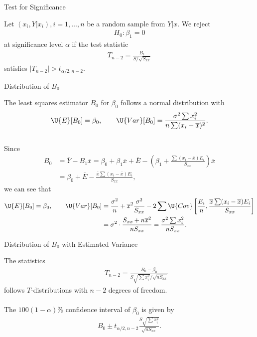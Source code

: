 \begin{frame}{Test for Significance}

\justifying
{} Let $(x_i, Y|x_i), i = 1, \ldots, n$ be a random sample from $Y|x$. We reject
\begin{align*}
H_0: \beta_1 = 0
\end{align*}
at significance level $\alpha$ if the test statistic
\begin{align*}
T_{n-2} = \frac{B_1}{S/\sqrt{S_{xx}}}
\end{align*}
satisfies $|T_{n-2}| > t_{\alpha/2,n-2}$.

\end{frame}

\begin{frame}{Distribution of $B_0$}

 The least squares estimator $B_0$ for $\beta_0$ follows a normal distribution with
\footnotesize
\begin{align*}
\U{E}[B_0] = \beta_0, \qquad \U{Var}[B_0] = \frac{\sigma^2\sum x_i^2}{n\sum (x_i-\overline{x})^2}.
\end{align*}\\
\normalsize
{} Since
\footnotesize
\begin{align*}
B_0 & = \overline{Y} - B_1\overline{x} = \beta_0 + \beta_1\overline{x} + \overline{E} - \left(\beta_1 + \frac{\sum (x_i-\overline{x})E_i}{S_{xx}} \right) \overline{x} \\
& = \beta_0 + \overline{E} - \frac{\overline{x}\sum (x_i-\overline{x})E_i}{S_{xx}},
\end{align*}
\normalsize
we can see that
\footnotesize
\begin{align*}
\U{E}[B_0] = \beta_0, \qquad \U{Var}[B_0] & = \frac{\sigma^2}{n} + \overline{x}^2 \frac{\sigma^2}{S_{xx}} - 2\sum \U{Cov}\left[\frac{E_i}{n}, \frac{\overline{x} \sum (x_i-\overline{x})E_i}{S_{xx}} \right] \\
& = \sigma^2\cdot \frac{S_{xx} + n\overline{x}^2}{nS_{xx}} = \frac{\sigma^2 \sum x_i^2}{nS_{xx}}.
\end{align*}
\normalsize

\end{frame}

\begin{frame}{Distribution of $B_0$ with Estimated Variance}

\justifying
{} The statistics
\begin{align*}
\qquad T_{n-2} = \frac{B_0-\beta_0}{S\sqrt{\sum x_i^2}/\sqrt{nS_{xx}}}
\end{align*}
follows $T$-distributions with $n-2$ degrees of freedom. \\
~\\
 The $100(1-\alpha)\%$ confidence interval of $\beta_0$ is given by
\begin{align*}
B_0 \pm t_{\alpha/2,n-2}\frac{S\sqrt{\sum x_i^2}}{\sqrt{nS_{xx}}}.
\end{align*}

\end{frame}


